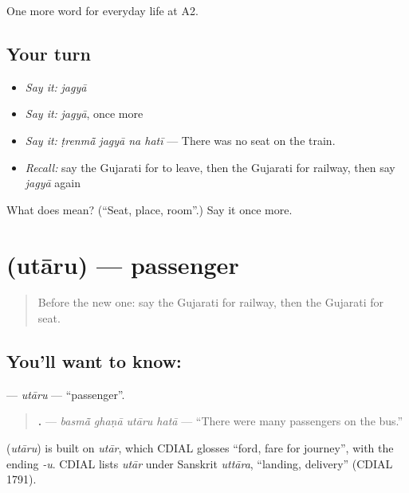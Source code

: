 \begin{grammarlens}[title={What you've built}]
One more word for everyday life at A2.
\end{grammarlens}

\subsection*{Your turn}
\begin{itemize}
\raggedright
  \item \emph{Say it:} \emph{jagyā}
  \item \emph{Say it:} \emph{jagyā}, once more
  \item \emph{Say it:} \emph{ṭrenmā̃ jagyā na hatī} — There was no seat on the train.
  \item \emph{Recall:} say the Gujarati for to leave, then the Gujarati for railway, then say \emph{jagyā} again
\end{itemize}

\begin{tcolorbox}[breakable,colback=teal!4,colframe=teal!35!black,title={Before you move on}]
What does  mean? (\textquotedblleft{}Seat, place, room\textquotedblright{}.) Say it once more.
\end{tcolorbox}
\section[\texorpdfstring{\gu{ઉતારુ} (utāru)}{ઉતારુ (utāru)}]{ (utāru) — passenger}

\label{lesson:GU-C205-utaru}



\begin{quote}
Before the new one: say the Gujarati for railway, then the Gujarati for seat.
\end{quote}

\subsection*{You'll want to know: }
\textbf{} — \emph{utāru} — \textquotedblleft{}passenger\textquotedblright{}.

\begin{quote}
\textbf{   .} — \emph{basmā̃ ghaṇā utāru hatā} — \textquotedblleft{}There were many passengers on the bus.\textquotedblright{}
\end{quote}

\begin{cousinweb}
\textbf{} (\emph{utāru}) is built on \emph{utār}, which CDIAL glosses \textquotedblleft{}ford, fare for journey\textquotedblright{}, with the ending \emph{-u}. CDIAL lists \emph{utār} under Sanskrit \emph{uttāra}, \textquotedblleft{}landing, delivery\textquotedblright{} (CDIAL 1791).
\end{cousinweb}

